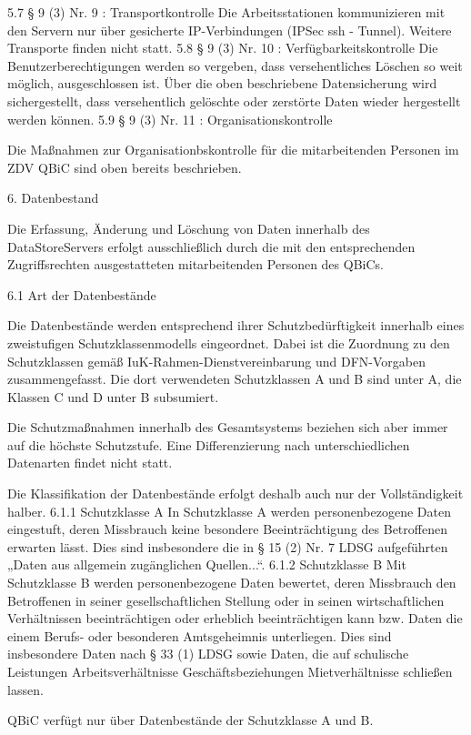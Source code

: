 \documentclass[]{scrreprt}
\begin{document}
5.7 § 9 (3) Nr. 9 : Transportkontrolle
Die Arbeitsstationen kommunizieren mit den Servern nur über gesicherte IP-Verbindungen (IPSec ssh - Tunnel). Weitere Transporte finden nicht statt.
5.8 § 9 (3) Nr. 10 : Verfügbarkeitskontrolle
Die Benutzerberechtigungen werden so vergeben, dass versehentliches Löschen so weit möglich, ausgeschlossen ist. Über die oben beschriebene Datensicherung wird sichergestellt, dass versehentlich gelöschte oder zerstörte Daten wieder hergestellt werden können.
5.9 § 9 (3) Nr. 11 : Organisationskontrolle

Die Maßnahmen zur Organisationbskontrolle für die mitarbeitenden Personen im ZDV QBiC sind oben bereits beschrieben.

6. Datenbestand

Die Erfassung, Änderung und Löschung von Daten innerhalb des DataStoreServers erfolgt ausschließlich durch die mit den entsprechenden Zugriffsrechten ausgestatteten mitarbeitenden Personen des QBiCs.

6.1 Art der Datenbestände

Die Datenbestände werden entsprechend ihrer Schutzbedürftigkeit innerhalb eines zweistufigen Schutzklassenmodells eingeordnet. Dabei ist die Zuordnung zu den Schutzklassen gemäß IuK-Rahmen-Dienstvereinbarung und DFN-Vorgaben zusammengefasst. Die dort verwendeten Schutzklassen A und B sind unter A, die Klassen C und D unter B subsumiert.

Die Schutzmaßnahmen innerhalb des Gesamtsystems beziehen sich aber immer auf die höchste Schutzstufe. Eine Differenzierung nach unterschiedlichen Datenarten findet nicht statt.

Die Klassifikation der Datenbestände erfolgt deshalb auch nur der Vollständigkeit halber.
6.1.1 Schutzklasse A
In Schutzklasse A werden personenbezogene Daten eingestuft, deren Missbrauch keine besondere Beeinträchtigung des Betroffenen erwarten lässt. Dies sind insbesondere die in § 15 (2) Nr. 7 LDSG aufgeführten „Daten aus allgemein zugänglichen Quellen...“. 
6.1.2 Schutzklasse B
Mit Schutzklasse B werden personenbezogene Daten bewertet, deren Missbrauch den Betroffenen in seiner gesellschaftlichen Stellung oder in seinen wirtschaftlichen Verhältnissen beeinträchtigen oder erheblich beeinträchtigen kann bzw. Daten die einem Berufs- oder besonderen Amtsgeheimnis unterliegen. Dies sind insbesondere Daten nach § 33 (1) LDSG sowie Daten, die auf
schulische Leistungen
Arbeitsverhältnisse
Geschäftsbeziehungen
Mietverhältnisse 	
schließen lassen.

QBiC verfügt nur über Datenbestände der Schutzklasse A und B.
\end{document}
